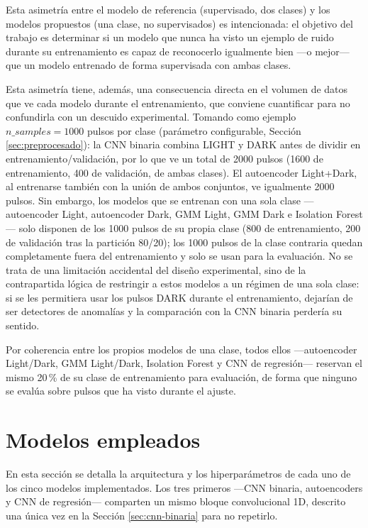 Esta asimetría entre el modelo de referencia (supervisado, dos clases) y los modelos propuestos (una clase, no supervisados) es intencionada: el objetivo del trabajo es determinar si un modelo que nunca ha visto un ejemplo de ruido durante su entrenamiento es capaz de reconocerlo igualmente bien —o mejor— que un modelo entrenado de forma supervisada con ambas clases.

Esta asimetría tiene, además, una consecuencia directa en el volumen de datos que ve cada modelo durante el entrenamiento, que conviene cuantificar para no confundirla con un descuido experimental. Tomando como ejemplo $n\_samples=1000$ pulsos por clase (parámetro configurable, Sección \ref{sec:preprocesado}): la CNN binaria combina LIGHT y DARK antes de dividir en entrenamiento/validación, por lo que ve un total de 2000 pulsos (1600 de entrenamiento, 400 de validación, de ambas clases). El autoencoder Light+Dark, al entrenarse también con la unión de ambos conjuntos, ve igualmente 2000 pulsos. Sin embargo, los modelos que se entrenan con una sola clase —autoencoder Light, autoencoder Dark, GMM Light, GMM Dark e Isolation Forest— solo disponen de los 1000 pulsos de su propia clase (800 de entrenamiento, 200 de validación tras la partición 80/20); los 1000 pulsos de la clase contraria quedan completamente fuera del entrenamiento y solo se usan para la evaluación. No se trata de una limitación accidental del diseño experimental, sino de la contrapartida lógica de restringir a estos modelos a un régimen de una sola clase: si se les permitiera usar los pulsos DARK durante el entrenamiento, dejarían de ser detectores de anomalías y la comparación con la CNN binaria perdería su sentido.

Por coherencia entre los propios modelos de una clase, todos ellos —autoencoder Light/Dark, GMM Light/Dark, Isolation Forest y CNN de regresión— reservan el mismo 20\,\% de su clase de entrenamiento para evaluación, de forma que ninguno se evalúa sobre pulsos que ha visto durante el ajuste.


\section{Modelos empleados}
\label{sec:modelos-empleados}

En esta sección se detalla la arquitectura y los hiperparámetros de cada uno de los cinco modelos implementados. Los tres primeros —CNN binaria, autoencoders y CNN de regresión— comparten un mismo bloque convolucional 1D, descrito una única vez en la Sección \ref{sec:cnn-binaria} para no repetirlo.

